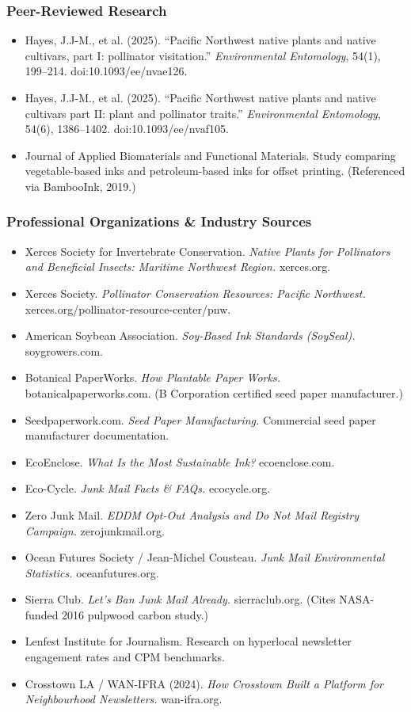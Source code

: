 \documentclass[11pt,letterpaper]{article}
\begin{document}
\subsubsection{Peer-Reviewed Research}
\begin{itemize}[leftmargin=1.5em]
  \item Hayes, J.J-M., et al. (2025). ``Pacific Northwest native plants and native cultivars, part I: pollinator visitation.'' \textit{Environmental Entomology}, 54(1), 199--214. doi:10.1093/ee/nvae126.
  \item Hayes, J.J-M., et al. (2025). ``Pacific Northwest native plants and native cultivars part II: plant and pollinator traits.'' \textit{Environmental Entomology}, 54(6), 1386--1402. doi:10.1093/ee/nvaf105.
  \item Journal of Applied Biomaterials and Functional Materials. Study comparing vegetable-based inks and petroleum-based inks for offset printing. (Referenced via BambooInk, 2019.)
\end{itemize}

\subsubsection{Professional Organizations \& Industry Sources}
\begin{itemize}[leftmargin=1.5em]
  \item Xerces Society for Invertebrate Conservation. \textit{Native Plants for Pollinators and Beneficial Insects: Maritime Northwest Region.} xerces.org.
  \item Xerces Society. \textit{Pollinator Conservation Resources: Pacific Northwest.} xerces.org/pollinator-resource-center/pnw.
  \item American Soybean Association. \textit{Soy-Based Ink Standards (SoySeal).} soygrowers.com.
  \item Botanical PaperWorks. \textit{How Plantable Paper Works.} botanicalpaperworks.com. (B Corporation certified seed paper manufacturer.)
  \item Seedpaperwork.com. \textit{Seed Paper Manufacturing.} Commercial seed paper manufacturer documentation.
  \item EcoEnclose. \textit{What Is the Most Sustainable Ink?} ecoenclose.com.
  \item Eco-Cycle. \textit{Junk Mail Facts \& FAQs.} ecocycle.org.
  \item Zero Junk Mail. \textit{EDDM Opt-Out Analysis and Do Not Mail Registry Campaign.} zerojunkmail.org.
  \item Ocean Futures Society / Jean-Michel Cousteau. \textit{Junk Mail Environmental Statistics.} oceanfutures.org.
  \item Sierra Club. \textit{Let's Ban Junk Mail Already.} sierraclub.org. (Cites NASA-funded 2016 pulpwood carbon study.)
  \item Lenfest Institute for Journalism. Research on hyperlocal newsletter engagement rates and CPM benchmarks.
  \item Crosstown LA / WAN-IFRA (2024). \textit{How Crosstown Built a Platform for Neighbourhood Newsletters.} wan-ifra.org.
\end{itemize}
\end{document}
